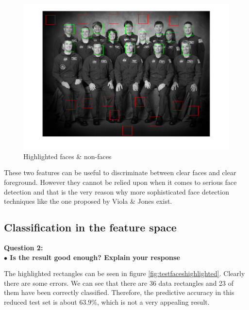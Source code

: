 \begin{figure}[h!tb]
	\centering
		\includegraphics[width=\textwidth]{./img/ex1/facesandnonfaceshighlighted.png}
	\caption{Highlighted faces \& non-faces}
	\label{fig:facesandnonfaceshighlighted}
\end{figure}

These two features can be useful to discriminate between clear faces and clear foreground. However they cannot be relied upon when it comes to serious face detection and that is the very reason why more sophisticated face detection techniques like the one proposed by Viola \& Jones exist.


\subsection{Classification in the feature space}

{\noindent\bfseries Question 2: \\ \indent $ \bullet $ Is the result good enough? Explain your response}

The highlighted rectangles can be seen in figure \ref{fig:testfaceshighlighted}. Clearly there are some errors. We can see that there are 36 data rectangles and 23 of them have been correctly classified. Therefore, the predictive accuracy in this reduced test set is about $ 63.9 \% $, which is not a very appealing result.

